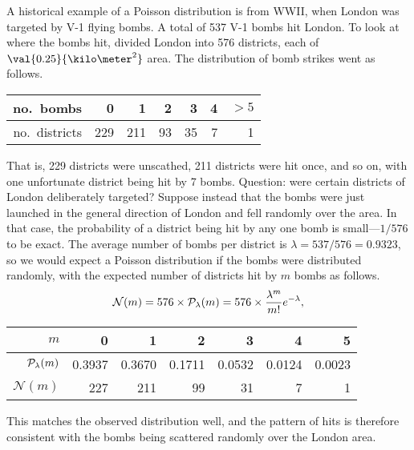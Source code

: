 A historical example of a Poisson distribution is from WWII, when London was targeted by V-1 flying bombs.  A total of 537 V-1 bombs hit London.  To look at where the bombs hit,  divided London into 576 districts, each of $\val{0.25}{\kilo\meter^{2}}$ area.  The distribution of bomb strikes went as follows.
\begin{center}
\begin{tabular}{r|rrrrrr}
no.\ bombs & 0 & 1 & 2 & 3 & 4 & $>5$\\
\hline
no.\ districts & 229 & 211 & 93 & 35 & 7 & 1\\
\end{tabular}
\end{center}
That is, 229 districts were unscathed, 211 districts were hit once, and so on, with one unfortunate district being hit by 7 bombs.  Question: were certain districts of London deliberately targeted? Suppose instead that the bombs were just launched in the general direction of London and fell randomly over the area.  In that case, the probability of a district being hit by any one bomb is small---$1/576$ to be exact.  The average number of bombs per district is $\lambda = 537/576 = 0.9323$, so we would expect a Poisson distribution if the bombs were distributed randomly, with the expected number of districts hit by $m$ bombs as follows.
\[ \mathcal{N}(m) = 576\times \mathcal{P}_{\lambda}(m) = 576\times \frac{\lambda^{m}}{m!}e^{-\lambda}, \]
\begin{center}
\begin{tabular}{r|rrrrrr}
$m$ & 0 & 1 & 2 & 3 & 4 & 5\\
\hline
$\mathcal{P}_{\lambda}(m)$ & 0.3937 & 0.3670 & 0.1711 & 0.0532 & 0.0124 & 0.0023\\
$\mathcal{N}(m)$ & 227 & 211 & 99 & 31 & 7 & 1
\end{tabular}
\end{center}
This matches the observed distribution well, and the pattern of hits is therefore consistent with the bombs being scattered randomly over the London area.

